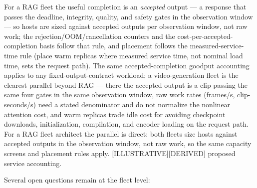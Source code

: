 For a RAG fleet the useful completion is an \emph{accepted} output --- a
response that passes the deadline, integrity, quality, and safety gates
in the observation window --- so hosts are sized against accepted
outputs per observation window, not raw work; the
rejection/OOM/cancellation counters and the cost-per-accepted-completion
basis follow that rule, and placement follows the measured-service-time
rule (place warm replicas where measured service time, not nominal load
time, sets the request path). The same accepted-completion goodput
accounting applies to any fixed-output-contract workload; a
video-generation fleet is the clearest parallel beyond RAG --- there the
accepted output is a clip passing the same four gates in the same
observation window, raw work rates (frames/s, clip-seconds/s) need a
stated denominator and do not normalize the nonlinear attention cost,
and warm replicas trade idle cost for avoiding checkpoint downloads,
initialization, compilation, and encoder loading on the request path.
For a RAG fleet architect the parallel is direct: both fleets size hosts
against accepted outputs in the observation window, not raw work, so the
same capacity screens and placement rules apply.
\mbox{{[}ILLUSTRATIVE{]}}\hspace{0pt}\mbox{{[}DERIVED{]}} proposed service accounting.

\label{what-we-still-dont-know}


Several open questions remain at the fleet level:

